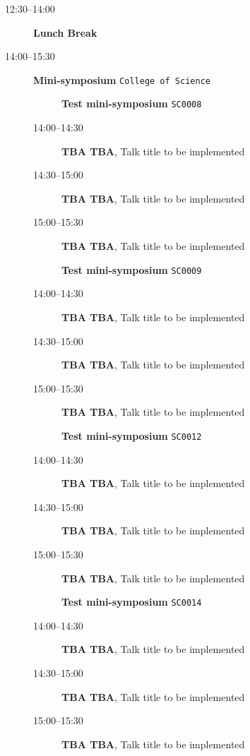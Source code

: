 \documentclass[ILAS2025-program.tex]{subfiles}
\begin{document}
\begin{description}
    \item[12:30--14:00] \textbf{Lunch Break} {\footnotesize\texttt{}}
    \item[14:00--15:30] \textbf{Mini-symposium} {\footnotesize\texttt{College of Science}}
    \begin{description}
    \item[] \textbf{Test mini-symposium} {\footnotesize\texttt{SC0008}}
    \item[14:00--14:30] \textbf{TBA TBA}, Talk title to be implemented
        \item[14:30--15:00] \textbf{TBA TBA}, Talk title to be implemented
        \item[15:00--15:30] \textbf{TBA TBA}, Talk title to be implemented
        \end{description}
    \begin{description}
    \item[] \textbf{Test mini-symposium} {\footnotesize\texttt{SC0009}}
    \item[14:00--14:30] \textbf{TBA TBA}, Talk title to be implemented
        \item[14:30--15:00] \textbf{TBA TBA}, Talk title to be implemented
        \item[15:00--15:30] \textbf{TBA TBA}, Talk title to be implemented
        \end{description}
    \begin{description}
    \item[] \textbf{Test mini-symposium} {\footnotesize\texttt{SC0012}}
    \item[14:00--14:30] \textbf{TBA TBA}, Talk title to be implemented
        \item[14:30--15:00] \textbf{TBA TBA}, Talk title to be implemented
        \item[15:00--15:30] \textbf{TBA TBA}, Talk title to be implemented
        \end{description}
    \begin{description}
    \item[] \textbf{Test mini-symposium} {\footnotesize\texttt{SC0014}}
    \item[14:00--14:30] \textbf{TBA TBA}, Talk title to be implemented
        \item[14:30--15:00] \textbf{TBA TBA}, Talk title to be implemented
        \item[15:00--15:30] \textbf{TBA TBA}, Talk title to be implemented
        \end{description}
    \begin{description}

\end{description}
\end{description}
\end{document}

